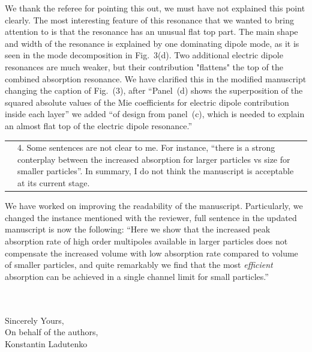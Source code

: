 \documentclass[a4paper]{article}
\begin{document}
We thank the referee for pointing this out, we must have not explained
this point clearly. The most interesting feature of this resonance
that we wanted to bring attention to is that the resonance has an
unusual flat top part. The main shape and width of the resonance is
explained by one dominating dipole mode, as it is seen in the mode
decomposition in Fig.~3(d). Two additional electric dipole resonances
are much weaker, but their contribution "flattens" the top of the
combined absorption resonance. We have clarified this in the modified
manuscript changing the caption of Fig.~(3), after ``Panel~(d) shows
the superposition of the squared absolute values of the Mie
coefficients for electric dipole contribution inside each layer'' we
added ``of design from panel~(c), which is needed to explain an almost
flat top of the electric dipole resonance.''


\begin{tabular}[!H]{l|p{}}
\quad & 4.  Some sentences are not clear to me. For instance, “there
is a strong conterplay between the increased absorption for larger
particles vs size for smaller particles”.  In summary, I do not think
the manuscript is acceptable at its current stage.
\end{tabular}%

We have worked on improving the readability of the
manuscript. Particularly, we changed the instance mentioned with the
reviewer, full sentence in the updated manuscript is now the
following: ``Here we show that the increased peak absorption rate of
high order multipoles available in larger particles does not
compensate the increased volume with low absorption rate compared to
volume of smaller particles, and quite remarkably we find that the
most {\em efficient} absorption can be achieved in a single channel
limit for small particles.''

\\
\vspace{10pt}
\\
Sincerely Yours,\\
On behalf of the authors,\\
Konstantin Ladutenko
\end{document}
